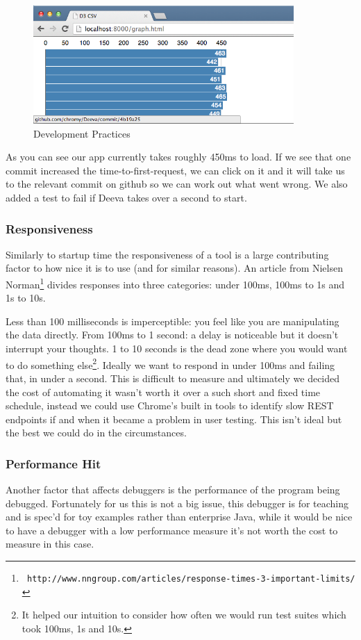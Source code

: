 \documentclass[11pt, a4paper]{article}
\begin{document}
\begin{figure}[h]
\centering
\includegraphics[height = 45mm]{testing.png}
\caption{Development Practices}
\label{fig:figure1}
\end{figure} 
 
As you can see our app currently takes roughly 450ms to load. If we see that one commit increased the time-to-first-request, we can click on it and it will take us to the relevant commit on github so we can work out what went wrong. We also added a test to fail if Deeva takes over a second to start.
\subsubsection{Responsiveness}

Similarly to startup time the responsiveness of a tool is a large contributing factor to how nice it is to use (and for similar reasons). An article from Nielsen Norman\footnote{\tt{ http://www.nngroup.com/articles/response-times-3-important-limits/}} divides responses into three categories: under 100ms, 100ms to 1s and 1s to 10s. 

Less than 100 milliseconds is imperceptible: you feel like you are manipulating the data directly. From 100ms to 1 second: a delay is noticeable but it doesn't interrupt your thoughts. 1 to 10 seconds is the dead zone where you would want to do something else\footnote{ It helped our intuition to consider how often we would run test suites which took 100ms, 1s and 10s.}. Ideally we want to respond in under 100ms and failing that, in under a second. This is difficult to measure and ultimately we decided the cost of automating it wasn't worth it over a such short and fixed time schedule, instead we could use Chrome's built in tools to identify slow REST endpoints if and when it became a problem in user testing. This isn't ideal but the best we could do in the circumstances.

\subsubsection{Performance Hit}
Another factor that affects debuggers is the performance of the program being debugged. Fortunately for us this is not a big issue, this debugger is for teaching and is spec'd for toy examples rather than enterprise Java, while it would be nice to have a debugger with a low performance measure it's not worth the cost to measure in this case.
\end{document}
